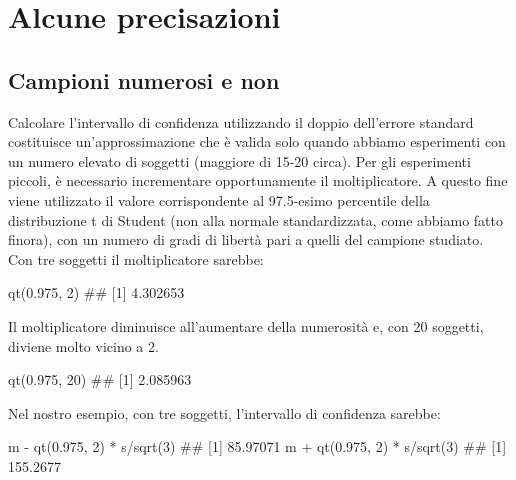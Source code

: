 \documentclass[a4paper,12pt,oneside]{book}
\newenvironment{Shaded}{\begin{snugshade}}{\end{snugshade}}
\newcommand{\DecValTok}[1]{#1}
\newcommand{\FloatTok}[1]{#1}
\newcommand{\SpecialCharTok}[1]{#1}
\newcommand{\DocumentationTok}[1]{#1}
\newcommand{\FunctionTok}[1]{#1}
\newcommand{\NormalTok}[1]{#1}
\begin{document}
\hypertarget{alcune-precisazioni}{%
\section{Alcune precisazioni}\label{alcune-precisazioni}}

\hypertarget{campioni-numerosi-e-non}{%
\subsection{Campioni numerosi e non}\label{campioni-numerosi-e-non}}

Calcolare l'intervallo di confidenza utilizzando il doppio dell'errore standard costituisce un'approssimazione che è valida solo quando abbiamo esperimenti con un numero elevato di soggetti (maggiore di 15-20 circa). Per gli esperimenti piccoli, è necessario incrementare opportunamente il moltiplicatore. A questo fine viene utilizzato il valore corrispondente al 97.5-esimo percentile della distribuzione t di Student (non alla normale standardizzata, come abbiamo fatto finora), con un numero di gradi di libertà pari a quelli del campione studiato. Con tre soggetti il moltiplicatore sarebbe:

\begin{Shaded}
\begin{Highlighting}[]
\FunctionTok{qt}\NormalTok{(}\FloatTok{0.975}\NormalTok{, }\DecValTok{2}\NormalTok{)}
\DocumentationTok{\#\# [1] 4.302653}
\end{Highlighting}
\end{Shaded}

Il moltiplicatore diminuisce all'aumentare della numerosità e, con 20 soggetti, diviene molto vicino a 2.

\begin{Shaded}
\begin{Highlighting}[]
\FunctionTok{qt}\NormalTok{(}\FloatTok{0.975}\NormalTok{, }\DecValTok{20}\NormalTok{)}
\DocumentationTok{\#\# [1] 2.085963}
\end{Highlighting}
\end{Shaded}

Nel nostro esempio, con tre soggetti, l'intervallo di confidenza sarebbe:

\begin{Shaded}
\begin{Highlighting}[]
\NormalTok{m }\SpecialCharTok{{-}} \FunctionTok{qt}\NormalTok{(}\FloatTok{0.975}\NormalTok{, }\DecValTok{2}\NormalTok{) }\SpecialCharTok{*}\NormalTok{ s}\SpecialCharTok{/}\FunctionTok{sqrt}\NormalTok{(}\DecValTok{3}\NormalTok{)}
\DocumentationTok{\#\# [1] 85.97071}
\NormalTok{m }\SpecialCharTok{+} \FunctionTok{qt}\NormalTok{(}\FloatTok{0.975}\NormalTok{, }\DecValTok{2}\NormalTok{) }\SpecialCharTok{*}\NormalTok{ s}\SpecialCharTok{/}\FunctionTok{sqrt}\NormalTok{(}\DecValTok{3}\NormalTok{)}
\DocumentationTok{\#\# [1] 155.2677}
\end{Highlighting}
\end{Shaded}
\end{document}
